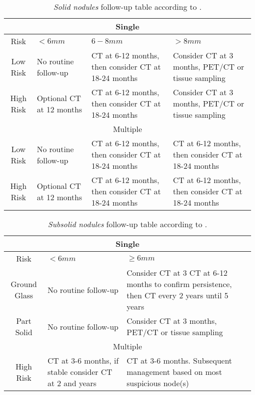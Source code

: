 \begin{center}
\begin{table}
\begin{centering}
\begin{tabular}{c|>{\centering}p{}|>{\centering}p{}|>{\centering}p{}}
\hline 
\multicolumn{4}{c}{Single}\tabularnewline
\hline 
Risk & $<6mm$ & $6-8mm$ & $>8mm$\tabularnewline
\hline 
Low Risk & No routine follow-up & CT at 6-12 months, then consider CT at 18-24 months & Consider CT at 3 months, PET/CT or tissue sampling\tabularnewline
High Risk & Optional CT at 12 months & CT at 6-12 months, then consider CT at 18-24 months & Consider CT at 3 months, PET/CT or tissue sampling\tabularnewline
\hline 
\multicolumn{4}{c}{Multiple}\tabularnewline
\hline 
Low Risk & No routine follow-up & CT at 6-12 months, then consider CT at 18-24 months & CT at 6-12 months, then consider CT at 18-24 months\tabularnewline
High Risk & Optional CT at 12 months & CT at 6-12 months, then consider CT at 18-24 months & CT at 6-12 months, then consider CT at 18-24 months\tabularnewline
\hline 
\end{tabular}
\par\end{centering}
\caption{\label{tab:solid_nodules} \emph{Solid nodules} follow-up table according to .}
\end{table}
\vspace*{-44pt}
\par\end{center}

\begin{center}
\begin{table}
\begin{centering}
\begin{tabular}{c|>{\centering}p{}|>{\centering}p{}}
\hline 
\multicolumn{3}{c}{Single}\tabularnewline
\hline 
Risk & $<6mm$ & $\geq6mm$\tabularnewline
\hline 
Ground Glass & No routine follow-up & Consider CT at 3 CT at 6-12 months to confirm persistence, then CT
every 2 years until 5 years\tabularnewline
Part Solid & No routine follow-up & Consider CT at 3 months, PET/CT or tissue sampling\tabularnewline
\hline 
\multicolumn{3}{c}{Multiple}\tabularnewline
\hline 
High Risk & CT at 3-6 months, if stable consider CT at 2 and years & CT at 3-6 months. Subsequent management based on most suspicious node(s)\tabularnewline
\hline 
\end{tabular}
\par\end{centering}
\caption{\label{tab:subsolid_nodules}\emph{Subsolid nodules} follow-up table according
to .}
\end{table}
\vspace*{-44pt}
\par\end{center}

